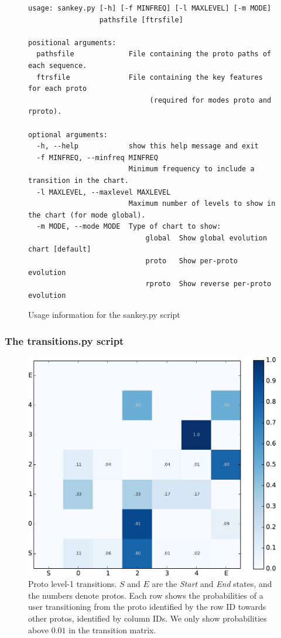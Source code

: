 \documentclass[]{article}
\begin{document}
\begin{figure}[h]
\small
\begin{Verbatim}[frame=single]
usage: sankey.py [-h] [-f MINFREQ] [-l MAXLEVEL] [-m MODE]
                 pathsfile [ftrsfile]

positional arguments:
  pathsfile             File containing the proto paths of each sequence.
  ftrsfile              File containing the key features for each proto 
                             (required for modes proto and rproto).

optional arguments:
  -h, --help            show this help message and exit
  -f MINFREQ, --minfreq MINFREQ
                        Minimum frequency to include a transition in the chart.
  -l MAXLEVEL, --maxlevel MAXLEVEL
                        Maximum number of levels to show in the chart (for mode global).
  -m MODE, --mode MODE  Type of chart to show:
                            global  Show global evolution chart [default]
                            proto   Show per-proto evolution
                            rproto  Show reverse per-proto evolution
\end{Verbatim}
\caption{Usage information for the sankey.py script}
\label{fig:verb:sankey}
\end{figure}

\subsubsection{The transitions.py script}
\label{sec:usage:viz:trans}

\begin{figure}[h] \centering
\includegraphics[width=0.4\columnwidth]{tprob}
\caption{Proto level-1 transitions. $S$ and $E$ are the \emph{Start} and \emph{End}
states, and the numbers denote protos. Each row shows the probabilities of a
user transitioning from the proto identified by the row ID towards other protos,
identified by column IDs. We only show probabilities above $0.01$ in the
transition matrix. }
\label{fig:proto-transitions}
\end{figure}
\end{document}
